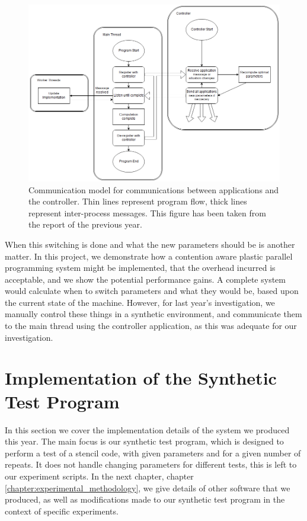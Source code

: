 \begin{figure}[H]
	\centering
	\includegraphics[width=1.1\textwidth]{graphics/controller_communication_flowchart.png}
	\caption{Communication model for communications between applications and the controller. Thin lines represent program flow, thick lines represent inter-process messages. This figure has been taken from the report of the previous year.}
	\label{fig:controller_flowchart}
\end{figure}



When this switching is done and what the new parameters should be is another matter. In this project, we demonstrate how a contention aware plastic parallel programming system might be implemented, that the overhead incurred is acceptable, and we show the potential performance gains. A complete system would calculate when to switch parameters and what they would be, based upon the current state of the machine. However, for last year's investigation, we manually control these things in a synthetic environment, and communicate them to the main thread using the controller application, as this was adequate for our investigation.



\section{Implementation of the Synthetic Test Program}
\label{section:implementation:implementation_of_the_synthetic_test_program}

In this section we cover the implementation details of the system we produced this year. The main focus is our synthetic test program, which is designed to perform a test of a stencil code, with given parameters and for a given number of repeats. It does not handle changing parameters for different tests, this is left to our experiment scripts. In the next chapter, chapter \ref{chapter:experimental_methodology}, we give details of other software that we produced, as well as modifications made to our synthetic test program in the context of specific experiments.



